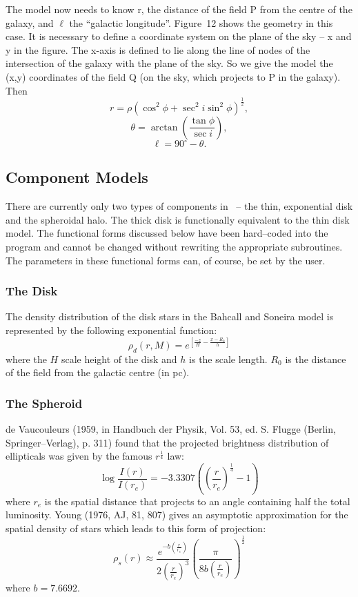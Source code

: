 The model now needs to know r, the distance of the field P from the
centre of the galaxy, and $\ell$ the ``galactic longitude''. Figure~12 shows
the geometry in this case. It is necessary to define a coordinate
system on the plane of the sky -- x and y in the figure. The x-axis is
defined to lie along the line of nodes of the intersection of the galaxy
with the plane of the sky. So we give the model the (x,y) coordinates of the
field Q (on the sky, which projects to P in the galaxy). Then
\[
r = \rho \left( \cos^2 \phi + \sec^2 i \sin^2 \phi \right) ^ {\frac{1}{2}},
\]
\[
\theta = \arctan \left( \frac{\tan \phi}{\sec i} \right),
\]
\[
\ell = 90^\circ - \theta.
\]

\subsection{Component Models}

There are currently only two types of components in \egm\ -- the thin, 
exponential
disk and the spheroidal halo. The thick disk is functionally equivalent to
the thin disk model. The functional forms discussed below have been
hard--coded into the program and cannot be changed without rewriting the
appropriate subroutines. The parameters in these functional forms can,
of course, be set by the user.

\subsubsection*{The Disk}

The density  distribution of  the disk stars in the Bahcall and  Soneira
model is represented by the following exponential function:
\[ 
\rho_d(r,M) = e^{\left[\frac{-z}{H} - \frac{x-R_0}{h} \right]}
\] 
where the $H$ scale height of the disk and $h$ is the scale length. 
$R_0$ is the distance of the field from the galactic centre (in pc).
 
\subsubsection*{The Spheroid}

de Vaucouleurs (1959,  in  Handbuch  der Physik, Vol. 53,  ed. S. Flugge
(Berlin, Springer--Verlag), p. 311) found  that the projected  brightness
distribution of ellipticals was given by the famous $r^\frac{1}{4}$ law:
\[
\log \frac{I(r)}{I(r_e)} = -3.3307 \left( \left(\frac{r}{r_e}\right)^
{\frac{1}{4}} - 1 \right)
\]
where  $r_e$  is the spatial distance that  projects to an angle containing
half the total luminosity. Young (1976, AJ, 81, 807) gives an asymptotic
approximation for the spatial density of stars  which leads to this form
of projection:
\[
\rho_s(r) \approx \frac{e^{-b\left(\frac{r}{r_e}\right)}}
{2\left(\frac{r}{r_e}\right)^3}
\left( \frac{\pi}{8 b \left(\frac{r}{r_e}\right)} \right)^{\frac{1}{2}}
\]
where $b = 7.6692$.

